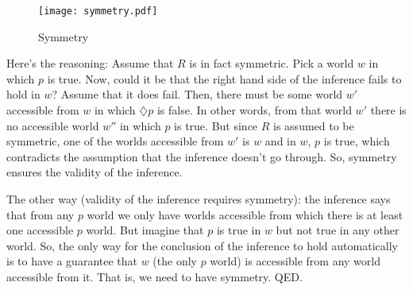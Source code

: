 \begin{figure}[htbp]
  \centering
    \texttt{[image: symmetry.pdf]}
  \caption{Symmetry}
  \label{fig:symmetry}
\end{figure}

\noindent Here's the reasoning: Assume that $R$ is in fact symmetric. Pick a world $w$ in which $p$ is true. Now, could it be that the right hand side of the inference fails to hold in $w$? Assume that it does fail. Then, there must be some world $w'$ accessible from $w$ in which $\diamondsuit p$ is false. In other words, from that world $w'$ there is no accessible world $w''$ in which $p$ is true. But since $R$ is assumed to be symmetric, one of the worlds accessible from $w'$ is $w$ and in $w$, $p$ is true, which contradicts the assumption that the inference doesn't go through. So, symmetry ensures the validity of the inference.

The other way (validity of the inference requires symmetry): the inference says that from any $p$ world we only have worlds accessible from which there is at least one accessible $p$ world. But imagine that $p$ is true in $w$ but not true in any other world. So, the only way for the conclusion of the inference to hold automatically is to have a guarantee that $w$ (the only $p$ world) is accessible from any world accessible from it. That is, we need to have symmetry. QED.

